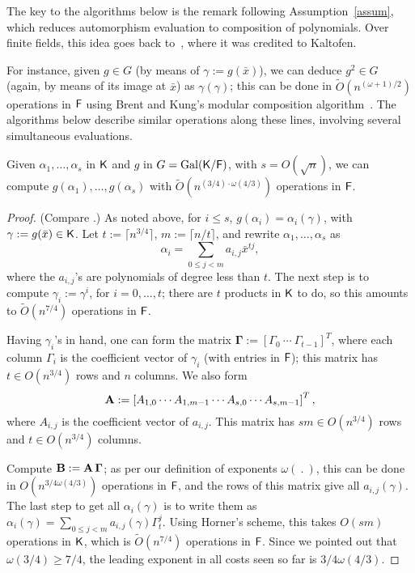 The key to the algorithms below is the remark following
Assumption~\ref{assum}, which reduces automorphism evaluation to
composition of polynomials.  Over finite fields, this idea goes back
to~, where it was credited to Kaltofen.

For instance, given $g \in G$ (by means of $\gamma:=g(\bar x)$), we can
deduce $g^2 \in G$ (again, by means of its image at $\bar x$) as
$\gamma(\gamma)$; this can be done in $\tilde{O}(n^{(\omega+1)/2})$
operations in ${\mathsf{F}}$ using Brent and Kung's modular composition
algorithm~\cite{BrKu78}. The algorithms below describe similar operations 
along these lines, involving several simultaneous evaluations.

\begin{lemma}\label{lem:modcom}
  Given $\alpha_1,\dots,\alpha_s$ in ${\mathsf{K}}$ and $g$ in $G =
  \mathrm{Gal}({\mathsf{K}}/{\mathsf{F}})$, with $s = O(\sqrt{n})$, we can compute
  $g(\alpha_1),\dots,g(\alpha_s)$ with $\tilde
  O(n^{(3/4)\cdot\omega(4/3)})$ operations in ${\mathsf{F}}$.
\end{lemma}
\begin{proof}
(Compare \cite[Lemma~3]{KalSho98}.) As noted above, for $i\le s$,
  $g(\alpha_i) = \alpha_i(\gamma)$, with $\gamma := g(\bar x) \in {\mathsf{K}}$.
  Let $t := \lceil n^{3/4} \rceil$, $m:=\lceil n/t\rceil$, and rewrite $\alpha_1 , \ldots , \alpha_s$ as 
$$\alpha_i = \sum_{0 \leq j < m} a_{i,j}\bar x^{tj},$$ where the
  $a_{i,j}$'s are polynomials of degree less than $t$. The next step
  is to compute $\gamma_i := \gamma^i$, for $i = 0 , \ldots , t$;
  there are $t$ products in ${\mathsf{K}}$ to do, so this amounts to
  $\tilde{O}(n^{7/4})$ operations in ${\mathsf{F}}$.

  Having $\gamma_i$'s in hand, one can form the matrix
  $\boldsymbol{\Gamma} := \left[ \Gamma_0 ~ \cdots ~ \Gamma_{t-1}
    \right]^T$, where each column $\Gamma_i$ is the coefficient vector
  of $\gamma_i$ (with entries in ${\mathsf{F}}$); this matrix has $t \in
  O(n^{3/4})$ rows and $n$ columns. We also form
  $$\mat A := \left[{A}_{1,0} \cdots {A}_{1,m-1} \cdots
    {A}_{s,0} \cdots {A}_{s,m-1}\right]^T,$$ where
  ${A}_{i,j}$ is the coefficient vector of $a_{i,j}$. This matrix 
  has $s m \in O(n^{3/4})$ rows and $t \in O(n^{3/4})$ columns.

  Compute $\mat B:=\mat A\, \boldsymbol{\Gamma}$; as per our
  definition of exponents $\omega(\ .\ )$, this can be done in
  $O(n^{3/4 \omega(4/3)})$ operations in ${\mathsf{F}}$, and the rows of this matrix
  give all $a_{i,j}(\gamma)$.  The last step to get all
  $\alpha_i(\gamma)$ is to write them as $\alpha_i(\gamma) = \sum_{0
    \leq j < m} a_{i,j}(\gamma) \Gamma_t^{j}.$ Using Horner's scheme,
  this takes $O(sm)$ operations in ${\mathsf{K}}$, which is $\tilde{O}(n^{7/4})$
  operations in ${\mathsf{F}}$. Since we pointed out that $\omega(3/4) \ge 7/4$,
  the leading exponent in all costs seen so far is
  ${3}/{4}\omega({4}/{3})$.
\end{proof}

